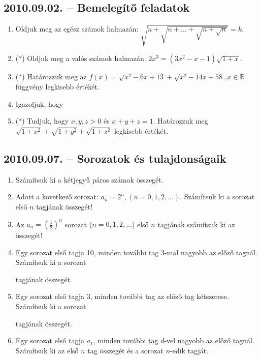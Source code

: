 \subsection*{2010.09.02. -- Bemelegítő feladatok}
\begin{enumerate}
\item Oldjuk meg az egész számok halmazán: 
$\sqrt{n+\sqrt{n+\ldots+\sqrt{n+\sqrt{n}}}}=k$.
\item ($*$) Oldjuk meg a valós számok halmazán:
$2x^3=(3x^2-x-1)\sqrt{1+x}$.
\item ($*$) Határozzuk meg az
$f(x)=\sqrt{x^2-6x+13}+\sqrt{x^2-14x+58}, x\in\mathbb{R}$ függvény legkisebb értékét.
\item Igazoljuk, hogy
\item ($*$) Tudjuk, hogy $x,y,z>0$ és $x+y+z=1$. Határozzuk meg 
$\sqrt{1+x^2}+\sqrt{1+y^2}+\sqrt{1+z^2}$ legkisebb értékét.
\end{enumerate}

\subsection*{2010.09.07. -- Sorozatok és tulajdonságaik}
\begin{enumerate}
\item Számítsuk ki a kétjegyű páros számok összegét.
\item Adott a következő sorozat: $a_n=2^n, (n=0,1,2,\ldots)$. Számítsuk ki a sorozat első $n$ tagjának összegét!
\item Az $a_n=\left(\frac{1}{2}\right)^n$ sorozat ($n=0,1,2,\ldots$) első $n$ tagjának számítsuk ki az összegét!
\item Egy sorozat első tagja 10, minden további tag 3-mal nagyobb az előző tagnál. Számítsuk ki a sorozat
tagjának összegét.
\item Egy sorozat első tagja 3, minden további tag az előző tag kétszerese. Számítsuk ki a sorozat
tagjának összegét.
\item Egy sorozat első tagja $a_1$, minden további tag $d$-vel nagyobb az előző tagnál. Számítsuk ki az első $n$ tag összegét és a sorozat $n$-edik tagját.
\end{enumerate}

